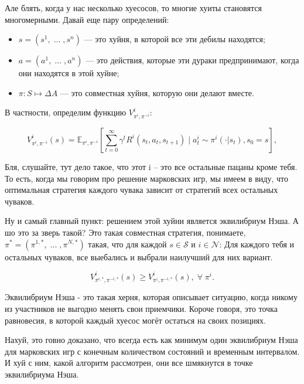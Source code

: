 Але блять, когда у нас несколько хуесосов, то многие хуиты становятся многомерными. Давай еще пару определений:

\begin{itemize}[label=---]
	\item \(s = (s^1, \; \dots \;, s^n)\) --- это хуйня, в которой все эти дебилы находятся;
	\item \(a = (a^1, \; \dots \;, a^n)\) --- это действия, которые эти дураки предпринимают, когда они находятся в этой хуйне;
	\item \( \pi : S \mapsto \Delta A \) --- это совместная хуйня, которую они делают вместе.
\end{itemize}

В частности, определим функцию \( V^i_{\pi^i, \pi^{-i}} \):

\begin{equation}
	V^i_{\pi^i, \pi^{-i}}(s) = \mathbb{E}_{\pi^i, \pi^{-i}} \left[ \sum_{t=0}^{\infty} \gamma^t R^i(s_t, a_t, s_{t+1}) \mid a^i_t \sim \pi^i(\cdot|s_t), s_0=s \right],
\end{equation}

Бля, слушайте, тут дело такое, что этот i – это все остальные пацаны кроме тебя. То есть, когда мы говорим про решение марковских игр, мы имеем в виду, что оптимальная стратегия каждого чувака зависит от стратегий всех остальных чуваков.

Ну и самый главный пункт: решением этой хуйни является эквилибриум Нэша. А шо это за зверь такой? Это такая совместная стратегия, понимаете, \(\pi^*=(\pi^{1,*}, \; \dots \;, \pi^{N, *})\) такая, что для каждой \(s \in \mathcal{S}\) и  \(i \in \mathcal{N}\):
Для каждого тебя и остальных чуваков, все выебались и выбрали наилучший для них вариант.


\begin{equation}
	V^i_{\pi^{i, *}, \pi^{-i, *}}(s) \geq  V^i_{\pi^i, \pi^{-i, *}}(s), \; \forall  \; \pi^i.
\end{equation}

Эквилибриум Нэша - это такая херня, которая описывает ситуацию, когда никому из участников не выгодно менять свои приемчики. Короче говоря, это точка равновесия, в которой каждый хуесос могёт остаться на своих позициях.

Нахуй, это говно доказано, что всегда есть как минимум один эквилибриум Нэша для марковских игр с конечным количеством состояний и временным интервалом. И хуй с ним, какой алгоритм рассмотрен, они все шмякнутся в точке эквилибриума Нэша. 

